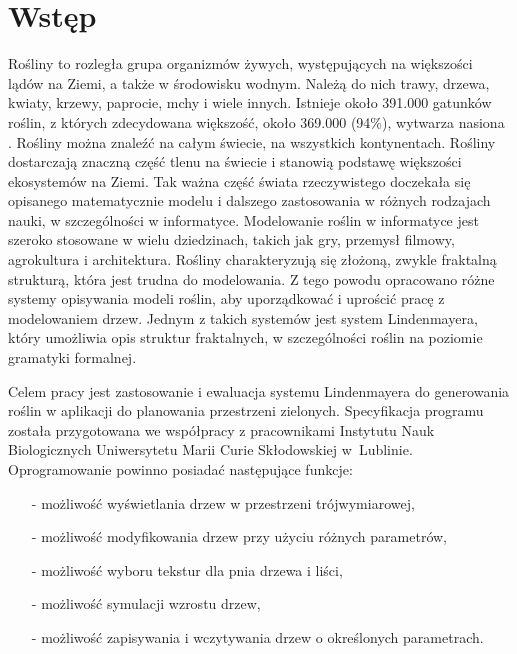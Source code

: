 \documentclass[a4paper,twoside,12pt]{report}
\begin{document}
\sloppy
\thispagestyle{empty}

\newpage{}

\thispagestyle{empty}
\newpage{}

\tableofcontents{}

\chapter*{Wstęp} 

Rośliny to rozległa grupa organizmów żywych, występujących na większości 
lądów na Ziemi, a także w środowisku wodnym. 
Należą do nich trawy, drzewa, kwiaty, krzewy, paprocie, mchy i wiele innych.
Istnieje około 391.000 gatunków roślin, z których zdecydowana większość,
około 369.000 (94\%), wytwarza nasiona \cite{howmanyplants}. Rośliny można znaleźć na 
całym świecie, na wszystkich kontynentach. Rośliny dostarczają znaczną część 
tlenu na świecie i stanowią podstawę
większości ekosystemów na Ziemi. Tak ważna część świata rzeczywistego
doczekała się opisanego matematycznie modelu i dalszego zastosowania w różnych rodzajach nauki, w
szczególności w informatyce. Modelowanie roślin w informatyce
jest szeroko stosowane w wielu dziedzinach, takich jak gry, przemysł filmowy, 
agrokultura i architektura. Rośliny charakteryzują się złożoną,
zwykle fraktalną strukturą, która jest trudna do modelowania.
Z tego powodu opracowano różne systemy opisywania modeli roślin,
aby uporządkować i uprościć pracę z modelowaniem drzew. Jednym z
takich systemów jest system Lindenmayera, który umożliwia opis struktur 
fraktalnych, w szczególności roślin na poziomie gramatyki formalnej.




Celem pracy jest zastosowanie i ewaluacja systemu Lindenmayera do generowania 
roślin w aplikacji do planowania przestrzeni zielonych. Specyfikacja programu 
została przygotowana we współpracy z pracownikami Instytutu Nauk Biologicznych 
Uniwersytetu Marii Curie Skłodowskiej w~Lublinie. Oprogramowanie powinno posiadać 
następujące funkcje:

\begin{itemize}
\setlength\itemsep{-0.4em}
\item[-] możliwość wyświetlania drzew w przestrzeni trójwymiarowej,
\item[-] możliwość modyfikowania drzew przy użyciu różnych parametrów,
\item[-] możliwość wyboru tekstur dla pnia drzewa i liści,
\item[-] możliwość symulacji wzrostu drzew,
\item[-] możliwość zapisywania i wczytywania drzew o określonych parametrach.

\end{itemize}
\end{document}
